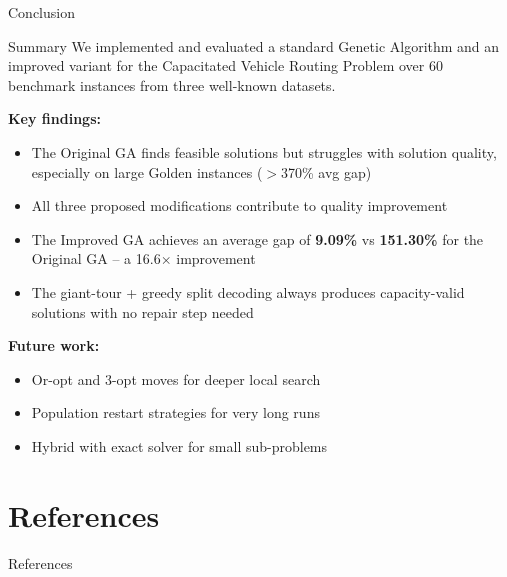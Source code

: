 \documentclass[aspectratio=169]{beamer}
\begin{document}
\begin{frame}{Conclusion}
  \begin{block}{Summary}
    We implemented and evaluated a standard Genetic Algorithm and an
    improved variant for the Capacitated Vehicle Routing Problem over
    60 benchmark instances from three well-known datasets.
  \end{block}

  \vspace{6pt}
  \textbf{Key findings:}
  \begin{itemize}
    \item The Original GA finds feasible solutions but struggles with solution
          quality, especially on large Golden instances ($>$370\% avg gap)
    \item All three proposed modifications contribute to quality improvement
    \item The Improved GA achieves an average gap of \textbf{9.09\%} vs
          \textbf{151.30\%} for the Original GA -- a 16.6$\times$ improvement
    \item The giant-tour + greedy split decoding always produces
          capacity-valid solutions with no repair step needed
  \end{itemize}

  \vspace{6pt}
  \textbf{Future work:}
  \begin{itemize}
    \item Or-opt and 3-opt moves for deeper local search
    \item Population restart strategies for very long runs
    \item Hybrid with exact solver for small sub-problems
  \end{itemize}
\end{frame}

\section*{References}

\begin{frame}[allowframebreaks]{References}
  \printbibliography[heading=none]
\end{frame}
\end{document}
